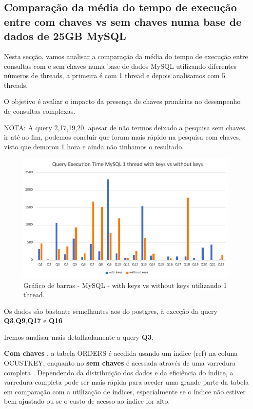 \documentclass{article}
\begin{document}
\clearpage


\subsection{Comparação da média do tempo de execução entre com chaves vs sem chaves numa base de dados de 25GB MySQL}

Nesta secção, vamos analisar a comparação da média do tempo de execução entre consultas com e sem chaves numa base de dados MySQL utilizando diferentes números de threads, a primeira é com 1 thread e depois analisamos com 5 threads.

O objetivo é avaliar o impacto da presença de chaves primárias no desempenho de consultas complexas.

NOTA: A query 2,17,19,20, apesar de não termos deixado a pesquisa sem chaves ir até ao fim, podemos concluir que foram mais rápido na pesquisa com chaves, visto que demorou 1 hora e ainda não tinhamos o resultado.


\begin{figure}[H]
  \centering
  \includegraphics[width=\textwidth]{Graphs/mysqlonethread_withkeysvswithoutkeys.png}
  \caption{Gráfico de barras - MySQL - with keys vs without keys utilizando 1 thread.} 
  \label{fig:PKCreation2}
\end{figure}
Os dados são bastante semelhantes aos do postgres, à exceção da query \textbf{Q3},\textbf{Q9},\textbf{Q17} e \textbf{Q16}

Iremos analisar mais detalhadamente a query \textbf{Q3}.

\textbf{Com chaves} ,  a tabela ORDERS é acedida usando um índice (ref) na coluna O\underline{}CUSTKEY, enquanto no \textbf{sem chaves} é acessada através de uma varredura completa . Dependendo da distribuição dos dados e da eficiência do índice, a varredura completa pode ser mais rápida para aceder uma grande parte da tabela em comparação com a utilização de índices, especialmente se o índice não estiver bem ajustado ou se o custo de acesso ao índice for alto.
\end{document}

